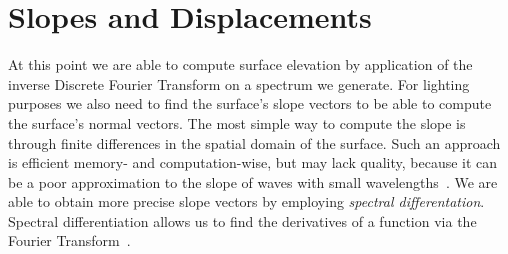 \section{Slopes and Displacements}
\label{sec:slopes_and_displacements}
At this point we are able to compute surface elevation by application of the
inverse Discrete Fourier Transform on a spectrum we generate. For lighting
purposes we also need to find the surface's slope vectors to be able to compute
the surface's normal vectors. The most simple way to compute the slope is
through finite differences in the spatial domain of the surface. Such an
approach is efficient memory- and computation-wise, but may lack quality,
because it can be a poor approximation to the slope of waves with small
wavelengths~\citep{course:simulatingocean}. We are able to obtain more precise
slope vectors by employing \emph{spectral differentation}. Spectral
differentiation allows us to find the derivatives of a function via the
Fourier Transform~\citep{Trefethen:2000}.

